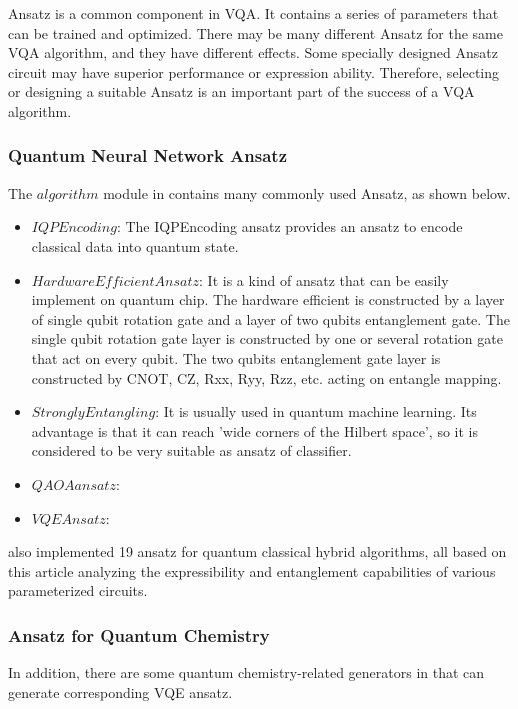 Ansatz is a common component in VQA. It contains a series of parameters that can be trained and optimized. There may be many different Ansatz for the same VQA algorithm, and they have different effects. Some specially designed Ansatz circuit may have superior performance or expression ability. Therefore, selecting or designing a suitable Ansatz is an important part of the success of a VQA algorithm.

\subsubsection{Quantum Neural Network Ansatz}
The $algorithm$ module in \MindQuantum contains many commonly used Ansatz, as shown below.

\begin{itemize}
    \item $IQPEncoding$: The IQPEncoding ansatz provides an ansatz to encode classical data into quantum state.

    \item $HardwareEfficientAnsatz$: It is a kind of ansatz that can be easily implement on quantum chip. The hardware efficient is constructed by a layer of single qubit rotation gate and a layer of two qubits entanglement gate. The single qubit rotation gate layer is constructed by one or several rotation gate that act on every qubit. The two qubits entanglement gate layer is constructed by CNOT, CZ, Rxx, Ryy, Rzz, etc. acting on entangle mapping.

    \item $StronglyEntangling$: It is usually used in quantum machine learning. Its advantage is that it can reach 'wide
          corners of the Hilbert space'\cite{Schuld_2020}, so it is considered to be very suitable as ansatz of classifier.

    \item $QAOA ansatz$:
    \item $VQE Ansatz$:
\end{itemize}

\MindQuantum also implemented 19 ansatz for quantum classical hybrid algorithms, all based on this article analyzing the expressibility and entanglement capabilities of various parameterized circuits.\cite{Sim_2019}
\subsubsection{Ansatz for Quantum Chemistry}
In addition, there are some quantum chemistry-related generators in \MindQuantum that can generate corresponding VQE ansatz.

